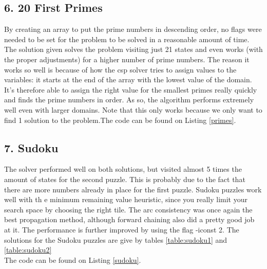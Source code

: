 \documentclass{article}
\begin{document}









\subsection*{6. 20 First Primes}
By creating an array to put the prime numbers in descending order, no flags were needed to be set for the problem to be solved in a reasonable amount of time. The solution given solves the problem visiting just 21 states and even works (with the proper adjustments) for a higher number of prime numbers. The reason it works so well is because of  how the csp solver tries to assign values to the variables: it starts at the end of the array with the lowest value of the domain. It's therefore able to assign the right value for the smallest primes really quickly and finds the prime numbers in order. As so, the algorithm performs extremely well even with larger domains. Note that this only works because we only want to find 1 solution to the problem.The code can be found on Listing \ref{primes}.



\subsection*{7. Sudoku}
The solver performed well on both solutions, but visited almost 5 times the amount of states for the second puzzle. This is probably due to the fact that there are more numbers already in place for the first puzzle. Sudoku puzzles work well with th e minimum remaining value heuristic, since you really limit your search space by choosing the right tile. The arc consistency was once again the best propagation method, although forward chaining also did a pretty good job at it. The performance is further improved by using the flag -iconst 2.
The solutions for the Sudoku puzzles are give by tables \ref{table:sudoku1} and \ref{table:sudoku2}\\

The code can be found on Listing \ref{sudoku}.


\end{document}
